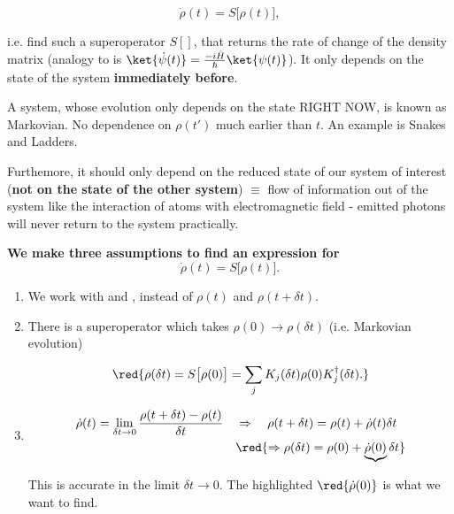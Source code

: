 \begin{equation}
  \label{eqn:openDesire}
  \dot{\rho}(t) = S\big[\rho(t)\big],
\end{equation}

\noindent i.e. find  such a superoperator $S[]$, that  returns the rate
of  change   of  the  density   matrix  (analogy  to   \schrodinger  is
$\ket{\dot{\psi}(t)} =  \frac{-i\hat{H}}{\hbar}\ket{\psi(t)}$). It only
depends on the state of the system \textbf{immediately before}.

{\Large A system, whose evolution only  depends on the state RIGHT NOW,
  is known as Markovian. No  dependence on $\rho(t')$ much earlier than
  $t$. An example is Snakes and Ladders.}

Furthemore, it should only depend on the reduced state of our system of
interest (\textbf{not on the state  of the other system}) $\equiv$ flow
of information  out of the  system like  the interaction of  atoms with
electromagnetic field - emitted photons will never return to the system
practically.

\vspace{2ex}
\begin{center}
  \textbf{{\Large We make three assumptions to find an expression for
      \begin{equation}
        \dot{\rho}(t) = S\big[\rho(t)\big].
      \end{equation} }}
\end{center}

\begin{enumerate}
\item We work with   and , instead
  of $\rho(t)$ and $\rho(t+\delta t)$.

\item      There      is      a     superoperator      which      takes
  $\rho(0) \rightarrow \rho(\delta t)$ (i.e. Markovian evolution)

  \begin{equation}
    \red{\rho(\delta t) = S\big[\rho(0)\big] = \sum_jK_j(\delta t)\rho(0)K_j^\dagger(\delta t).}
    \label{eqn:openSuperoperator}
  \end{equation}

\item
  \begin{equation}
    \begin{aligned}
      \dot{\rho}(t) = \lim\limits_{\delta t\rightarrow0}\frac{\rho(t+\delta t)-\rho(t)}{\delta t} \quad & \Rightarrow \quad {\rho(t+\delta t) = \rho(t) + \dot{\rho}(t)\delta t}\\
      &     \red{\Rightarrow\rho(\delta     t)      =     \rho(0)     +
        \underbrace{\dot{\rho}(0)}\delta t}
    \end{aligned}
    \label{eqn:openDerivatives}
  \end{equation}

  \noindent This is  accurate in the limit  $\delta t\rightarrow0$. The
  highlighted $\red{\dot{\rho}(0)}$ is what we want to find.

\end{enumerate}
\vspace{3ex}

